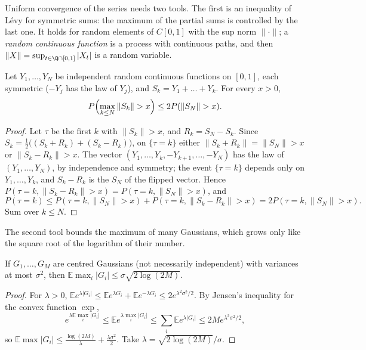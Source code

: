 Uniform convergence of the series needs two tools. The first is an inequality of L\'evy for symmetric sums: the maximum of the partial sums is controlled by the last one. It holds for random elements of
$C[0,1]$ with the sup norm $\|\cdot\|$; a \emph{random continuous function} is a process with continuous paths, and then $\|X\|=\sup_{t\in\Q\cap[0,1]}|X_t|$ is a random variable.

\begin{lemma}\label{lem:levymax}
Let $Y_1,\dots,Y_N$ be independent random continuous functions on $[0,1]$, each symmetric ($-Y_j$ has the law of $Y_j$), and $S_k=Y_1+\dots+Y_k$. For every $x>0$,
\[
P\Bigl(\max_{k\le N}\|S_k\|>x\Bigr)\le2P(\|S_N\|>x).
\]
\end{lemma}

\begin{proof}
Let $\tau$ be the first $k$ with $\|S_k\|>x$, and $R_k=S_N-S_k$. Since $S_k=\frac12\bigl((S_k+R_k)+(S_k-R_k)\bigr)$, on $\{\tau=k\}$ either $\|S_k+R_k\|=\|S_N\|>x$ or $\|S_k-R_k\|>x$. The vector
$(Y_1,\dots,Y_k,-Y_{k+1},\dots,-Y_N)$ has the law of $(Y_1,\dots,Y_N)$, by independence and symmetry; the event $\{\tau=k\}$ depends only on $Y_1,\dots,Y_k$, and $S_k-R_k$ is the $S_N$ of the flipped vector. Hence
$P(\tau=k,\|S_k-R_k\|>x)=P(\tau=k,\|S_N\|>x)$, and
\[P(\tau=k)\le P(\tau=k,\|S_N\|>x)+P(\tau=k,\|S_k-R_k\|>x)=2P(\tau=k,\|S_N\|>x).\]
Sum over $k\le N$.
\end{proof}

The second tool bounds the maximum of many Gaussians, which grows only like the square root of the logarithm of their number.

\begin{lemma}\label{lem:gaussmax}
If $G_1,\dots,G_M$ are centred Gaussians (not necessarily independent) with variances at most $\sigma^2$, then $\mathbb E\max_i|G_i|\le\sigma\sqrt{2\log(2M)}$.
\end{lemma}

\begin{proof}
For $\lambda>0$, $\mathbb E e^{\lambda|G_i|}\le\mathbb E e^{\lambda G_i}+\mathbb E e^{-\lambda G_i}\le2e^{\lambda^2\sigma^2/2}$. By Jensen's inequality for the convex function $\exp$,
\[
e^{\lambda\mathbb E\max_i|G_i|}\le\mathbb E e^{\lambda\max_i|G_i|}\le\sum_i\mathbb E e^{\lambda|G_i|}\le2Me^{\lambda^2\sigma^2/2},
\]
so $\mathbb E\max|G_i|\le\frac{\log(2M)}\lambda+\frac{\lambda\sigma^2}2$. Take $\lambda=\sqrt{2\log(2M)}/\sigma$.
\end{proof}

